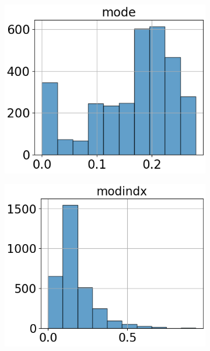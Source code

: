 \begin{figure}[htbp]
\begin{subfigure}[t]{.24\textwidth}
        \includegraphics[width=\linewidth]{../../python_code/plots/logistic_regression/histogram-mode.png}
    \end{subfigure}
    \begin{subfigure}[t]{.24\textwidth}
        \centering 
        \includegraphics[width=\linewidth]{../../python_code/plots/logistic_regression/histogram-modindx.png}
    \end{subfigure}
    \begin{subfigure}[t]{.24\textwidth}
        \centering 

\end{subfigure}
\end{figure}
